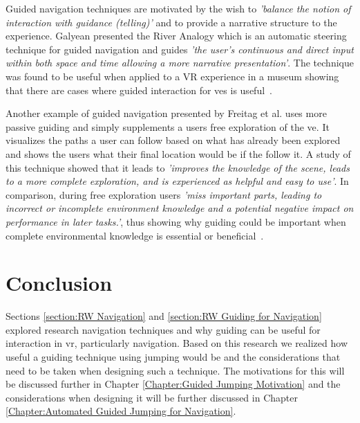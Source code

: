 Guided navigation techniques are motivated by the wish to \textit{'balance the notion of interaction with guidance (telling)'} and to provide a narrative structure to the experience. Galyean presented the River Analogy which is an automatic steering technique for guided navigation and guides \textit{'the user’s continuous and direct input within both space and time allowing a more narrative presentation'}. The technique was found to be useful when applied to a VR experience in a museum showing that there are cases where guided interaction for \acrshort{ve}s is useful~\cite{Galyean1995}.

Another example of guided navigation presented by Freitag et al. uses more passive guiding and simply supplements a users free exploration of the \acrshort{ve}. It visualizes the paths a user can follow based on what has already been explored and shows the users what their final location would be if the follow it. A study of this technique showed that it leads to \textit{'improves the knowledge of the scene, leads to a more complete exploration, and is experienced as helpful and easy to use'}. In comparison, during free exploration users \textit{'miss important parts, leading to incorrect or incomplete environment knowledge and a potential negative impact on performance in later tasks.'}, thus showing why guiding could be important when complete environmental knowledge is essential or beneficial~\cite{Freitag2018}.

\section{Conclusion}
\label{section:RW Conclusion}
Sections \ref{section:RW Navigation} and \ref{section:RW Guiding for Navigation} explored research navigation techniques and why guiding can be useful for interaction in \acrshort{vr}, particularly navigation. Based on this research we realized how useful a guiding technique using jumping would be and the considerations that need to be taken when designing such a technique. The motivations for this will be discussed further in Chapter \ref{Chapter:Guided Jumping Motivation} and the considerations when designing it will be further discussed in Chapter \ref{Chapter:Automated Guided Jumping for Navigation}.